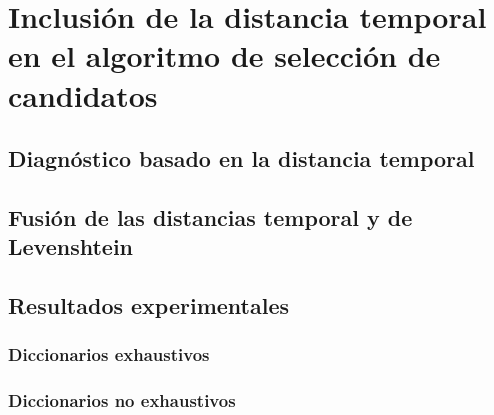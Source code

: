 \chapter{Inclusión de la distancia temporal en el algoritmo de selección de
candidatos}
\label{ch:Cycle}

\lettrine[lraise=-0.1, lines=2, loversize=0.2]{}{}


\section{Diagnóstico basado en la distancia temporal}
\label{sec:CycleCands}


\section{Fusión de las distancias temporal y de Levenshtein}
\label{sec:FusionLevenCycle}


\section{Resultados experimentales}
\label{sec:CycleResults}


\subsection{Diccionarios exhaustivos}
\label{subsec:CycDicExhaust}


\subsection{Diccionarios no exhaustivos}
\label{subsec:CycDicNoExhaust}


\endinput

